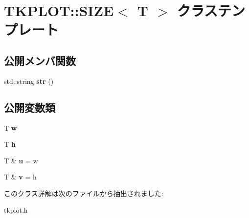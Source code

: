 \hypertarget{class_t_k_p_l_o_t_1_1_s_i_z_e}{}\section{T\+K\+P\+L\+OT\+:\+:S\+I\+ZE$<$ T $>$ クラステンプレート}
\label{class_t_k_p_l_o_t_1_1_s_i_z_e}
\subsection*{公開メンバ関数}
\begin{DoxyCompactItemize}
\item 
\mbox{\label{class_t_k_p_l_o_t_1_1_s_i_z_e_a876e32d89a46cb96f9020c699b43b9ed}} 
std\+::string {\bfseries str} ()
\end{DoxyCompactItemize}
\subsection*{公開変数類}
\begin{DoxyCompactItemize}
\item 
\mbox{\label{class_t_k_p_l_o_t_1_1_s_i_z_e_a11e6a0ae01e934f1f03cd091a778a4f7}} 
T {\bfseries w}
\item 
\mbox{\label{class_t_k_p_l_o_t_1_1_s_i_z_e_af53c6cc5ae8485c0e5842ce59783d39e}} 
T {\bfseries h}
\item 
\mbox{\label{class_t_k_p_l_o_t_1_1_s_i_z_e_ad01852541685a33ee9ac7fb1fbee13bf}} 
T \& {\bfseries u} = w
\item 
\mbox{\label{class_t_k_p_l_o_t_1_1_s_i_z_e_ac1fb3da1cbaf26656371b68b1f2955a3}} 
T \& {\bfseries v} = h
\end{DoxyCompactItemize}


このクラス詳解は次のファイルから抽出されました\+:\begin{DoxyCompactItemize}
\item 
tkplot.\+h\end{DoxyCompactItemize}
